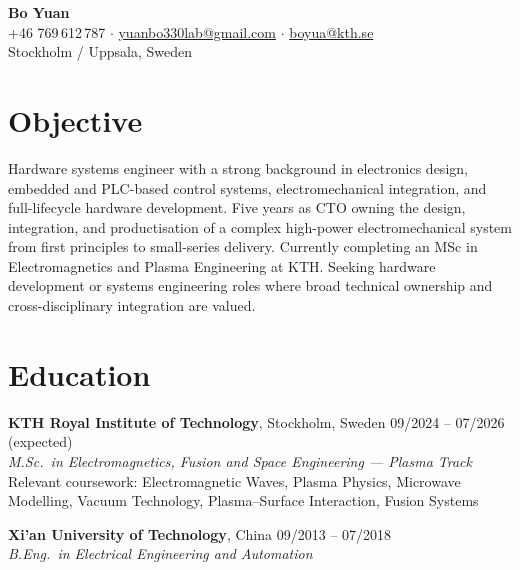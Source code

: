 \documentclass[a4paper,11pt]{article}
\begin{document}
\begin{center}
    {\LARGE \textbf{Bo Yuan}} \\
    \vspace{0.15cm}
    +46 769\,612\,787 \enspace $\cdot$ \enspace
    \href{mailto:yuanbo330lab@gmail.com}{yuanbo330lab@gmail.com} \enspace $\cdot$ \enspace
    \href{mailto:boyua@kth.se}{boyua@kth.se} \\
    Stockholm / Uppsala, Sweden
\end{center}

\vspace{0.3cm}

\section*{Objective}

Hardware systems engineer with a strong background in electronics design,
embedded and PLC-based control systems, electromechanical integration, and
full-lifecycle hardware development. Five years as CTO owning the design,
integration, and productisation of a complex high-power electromechanical system
from first principles to small-series delivery. Currently completing an MSc in
Electromagnetics and Plasma Engineering at KTH. Seeking hardware development or
systems engineering roles where broad technical ownership and cross-disciplinary
integration are valued.

\section*{Education}

\noindent\textbf{KTH Royal Institute of Technology}, Stockholm, Sweden
\hfill 09/2024 -- 07/2026 (expected) \\
\textit{M.Sc.\ in Electromagnetics, Fusion and Space Engineering --- Plasma Track} \\
Relevant coursework: Electromagnetic Waves, Plasma Physics, Microwave Modelling,
Vacuum Technology, Plasma--Surface Interaction, Fusion Systems

\medskip
\noindent\textbf{Xi'an University of Technology}, China \hfill 09/2013 -- 07/2018 \\
\textit{B.Eng.\ in Electrical Engineering and Automation}

\end{document}
